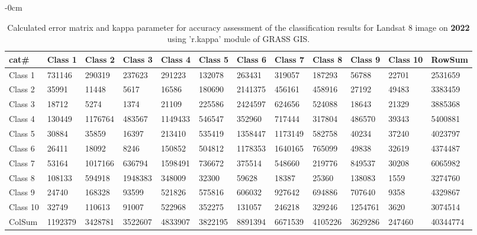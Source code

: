 \documentclass[analytics,article,submit,pdftex,moreauthors]{Definitions/mdpi}
\begin{document}
\begin{table}[H] 
\footnotesize
    \centering
    \begin{adjustwidth}{-\extralength}{0cm}
    \caption{Calculated error matrix and kappa parameter for accuracy assessment of the classification results for Landsat 8 image on \textbf{2022} using 'r.kappa' module of GRASS GIS.\label{tab03}}
 	\begin{tabularx}{\fulllength}{|l|l|l|l|l|l|l|l|l|l|l|l|}
    \toprule
         \textbf{cat\#} & \textbf{Class 1} & \textbf{Class 2} & \textbf{Class 3} & \textbf{Class 4} & \textbf{Class 5} & \textbf{Class 6} & \textbf{Class 7} & \textbf{Class 8} & \textbf{Class 9} & \textbf{Class 10} & \textbf{RowSum} \\ \hline
        Class 1 & \cellcolor{green!10}731146 & 290319 & 237623 & 291223 & 132078 & 263431 & 319057 & 187293 & 56788 & 22701 & 2531659 \\ \hline
        Class 2 & 35991 & \cellcolor{green!10}11448 & 5617 & 16586 & 180690 & 2141375 & 456161 & 458916 & 27192 & 49483 & 3383459 \\ \hline
        Class 3 & 18712 & 5274 & \cellcolor{green!10}1374 & 21109 & 225586 & 2424597 & 624656 & 524088 & 18643 & 21329 & 3885368 \\ \hline
        Class 4 & 130449 & 1176764 & 483567 & \cellcolor{green!10}1149433 & 546547 & 352960 & 717444 & 317804 & 486570 & 39343 & 5400881 \\ \hline
        Class 5 & 30884 & 35859 & 16397 & 213410 & \cellcolor{green!10}535419 & 1358447 & 1173149 & 582758 & 40234 & 37240 & 4023797 \\ \hline
        Class 6 & 26411 & 18092 & 8246 & 150852 & 504812 & \cellcolor{green!10}1178353 & 1640165 & 765099 & 49838 & 32619 & 4374487 \\ \hline
        Class 7 & 53164 & 1017166 & 636794 & 1598491 & 736672 & 375514 & \cellcolor{green!10}548660 & 219776 & 849537 & 30208 & 6065982 \\ \hline
        Class 8 & 108133 & 594918 & 1948383 & 348009 & 32300 & 59628 & 18387 & \cellcolor{green!10}25360 & 138083 & 1559 & 3274760 \\ \hline
        Class 9 & 24740 & 168328 & 93599 & 521826 & 575816 & 606032 & 927642 & 694886 & \cellcolor{green!10}707640 & 9358 & 4329867 \\ \hline
        Class 10 & 32749 & 110613 & 91007 & 522968 & 352275 & 131057 & 246218 & 329246 & 1254761 & \cellcolor{green!10}3620 & 3074514 \\ \hline
        ColSum & 1192379 & 3428781 & 3522607 & 4833907 & 3822195 & 8891394 & 6671539 & 4105226 & 3629286 & 247460 & \cellcolor{green!10}40344774 \\ \hline
     \bottomrule
    \end{tabularx}
    \end{adjustwidth}
\end{table}
\end{document}
